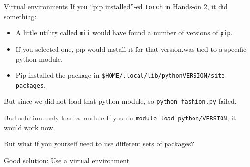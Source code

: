 \documentclass[
  10pt,
  ignorenonframetext,
  aspectratio=169]{beamer}
\newenvironment{Shaded}{\begin{snugshade}}{\end{snugshade}}
\newcommand{\AttributeTok}[1]{\textcolor[rgb]{0.80,0.80,0.80}{#1}}
\newcommand{\ExtensionTok}[1]{\textcolor[rgb]{0.80,0.80,0.80}{#1}}
\newcommand{\KeywordTok}[1]{\textcolor[rgb]{0.94,0.87,0.69}{#1}}
\newcommand{\NormalTok}[1]{\textcolor[rgb]{0.80,0.80,0.80}{#1}}
\newcommand{\VariableTok}[1]{\textcolor[rgb]{0.80,0.80,0.80}{#1}}
\begin{document}
\begin{frame}[fragile]{Virtual environments}
\label{virtual-environments}
If you ``pip installed''-ed \texttt{torch} in Hands-on 2, it did something:

\pause

\begin{itemize}
\item
  A little utility called \texttt{mii} would have found a number of versions of \texttt{pip}.\vspace{-2mm}

  \pause
\item
  If you selected one, pip would install it for that version.was tied to a specific python module.\vspace{-2mm}

  \pause
\item
  Pip installed the package in \texttt{\$HOME/.local/lib/pythonVERSION/site-packages}.
\end{itemize}

But since we did not load that python module, so \texttt{python\ fashion.py} failed.

\begin{block}{Bad solution: only load a module}\setlength{\parskip}{0.5\baselineskip}
\label{bad-solution-only-load-a-module}
If you do \texttt{module\ load\ python/VERSION}, it would work now.

But what if you yourself need to use different sets of packages?
\end{block}

\begin{block}{Good solution: Use a virtual environment}\setlength{\parskip}{0.5\baselineskip}
\label{good-solution-use-a-virtual-environment}
\vspace{-2mm}

\begin{Shaded}
\end{Shaded}
\end{block}
\end{frame}
\end{document}
